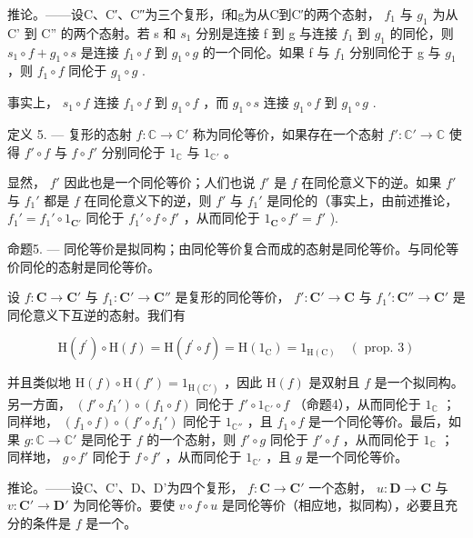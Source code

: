推论。——设C、C′、C″为三个复形，f和g为从C到C′的两个态射， \(f_{1}\) 与 \(g_{1}\) 为从 C' 到 C'' 的两个态射。若 s 和 \(s_{1}\) 分别是连接 f 到 g 与连接 \(f_{1}\) 到 \(g_{1}\) 的同伦，则 \(s_{1} \circ f + g_{1} \circ s\) 是连接 \(f_{1} \circ f\) 到 \(g_{1} \circ g\) 的一个同伦。如果 f 与 \(f_{1}\) 分别同伦于 g 与 \(g_{1}\) ，则 \(f_{1} \circ f\) 同伦于 \(g_{1} \circ g\) .

事实上， \(s_{1} \circ f\) 连接 \(f_{1} \circ f\) 到 \(g_{1} \circ f\) ，而 \(g_{1} \circ s\) 连接 \(g_{1} \circ f\) 到 \(g_{1} \circ g\) .

定义 5. --- 复形的态射 \(f: \mathbb{C} \to \mathbb{C}'\) 称为同伦等价，如果存在一个态射 \(f': \mathbb{C}' \to \mathbb{C}\) 使得 \(f' \circ f\) 与 \(f \circ f'\) 分别同伦于 \(1_{\mathbb{C}}\) 与 \(1_{\mathbb{C}'}\) 。

显然， \(f'\) 因此也是一个同伦等价；人们也说 \(f'\) 是 \(f\) 在同伦意义下的逆。如果 \(f'\) 与 \(f_1'\) 都是 \(f\) 在同伦意义下的逆，则 \(f'\) 与 \(f_1'\) 是同伦的（事实上，由前述推论， \(f_1' = f_1' \circ 1_{\mathbf{C}'}\) 同伦于 \(f_1' \circ f \circ f'\) ，从而同伦于 \(1_{\mathbf{C}} \circ f' = f'\) ).

命题5. — 同伦等价是拟同构；由同伦等价复合而成的态射是同伦等价。与同伦等价同伦的态射是同伦等价。

设 \(f: \mathbf{C} \to \mathbf{C}'\) 与 \(f_1: \mathbf{C}' \to \mathbf{C}''\) 是复形的同伦等价， \(f': \mathbf{C}' \to \mathbf{C}\) 与 \(f_1': \mathbf{C}'' \to \mathbf{C}'\) 是同伦意义下互逆的态射。我们有

\[
\mathrm{H} (f ^ {\prime}) \circ \mathrm{H} (f) = \mathrm{H} (f ^ {\prime} \circ f) = \mathrm{H} (1 _ {\mathrm{C}}) = 1 _ {\mathrm{H(C)}} \quad (\text { prop. } 3)
\]

并且类似地 \(\mathrm{H}(f) \circ \mathrm{H}(f') = 1_{\mathrm{H}(\mathbb{C}')}\) ，因此 \(\mathrm{H}(f)\) 是双射且 \(f\) 是一个拟同构。另一方面， \((f' \circ f_1') \circ (f_1 \circ f)\) 同伦于 \(f' \circ 1_{\mathbb{C}'} \circ f\) （命题4），从而同伦于 \(1_{\mathbb{C}}\) ；同样地， \((f_1 \circ f) \circ (f' \circ f_1')\) 同伦于 \(1_{\mathbb{C}''}\) ，且 \(f_1 \circ f\) 是一个同伦等价。最后，如果 \(g: \mathbb{C} \to \mathbb{C}'\) 是同伦于 \(f\) 的一个态射，则 \(f' \circ g\) 同伦于 \(f' \circ f\) ，从而同伦于 \(1_{\mathbb{C}}\) ；同样地， \(g \circ f'\) 同伦于 \(f \circ f'\) ，从而同伦于 \(1_{\mathbb{C}'}\) ，且 \(g\) 是一个同伦等价。

推论。——设C、C'、D、D'为四个复形， \(f: \mathbf{C} \to \mathbf{C}'\) 一个态射， \(u: \mathbf{D} \to \mathbf{C}\) 与 \(v: \mathbf{C}' \to \mathbf{D}'\) 为同伦等价。要使 \(v \circ f \circ u\) 是同伦等价（相应地，拟同构），必要且充分的条件是 \(f\) 是一个。

